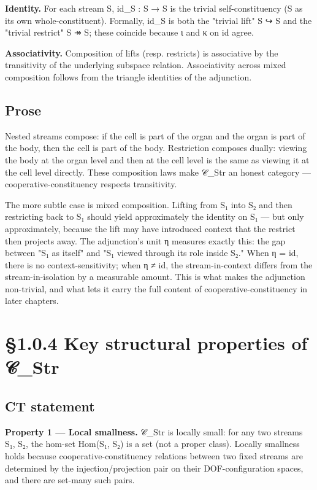 \documentclass[11pt, openany]{book}
\newcommand{\sectionbreak}{\clearpage}
\begin{document}
\textbf{Identity.} For each stream S, id\_\allowbreak{}S : S → S is the trivial self-constituency (S as its own whole-constituent). Formally, id\_\allowbreak{}S is both the "trivial lift" S ↪ S and the "trivial restrict" S ↠ S; these coincide because ι and κ on id agree.

\textbf{Associativity.} Composition of lifts (resp. restricts) is associative by the transitivity of the underlying subspace relation. Associativity across mixed composition follows from the triangle identities of the adjunction.

\subsection{Prose}

Nested streams compose: if the cell is part of the organ and the organ is part of the body, then the cell is part of the body. Restriction composes dually: viewing the body at the organ level and then at the cell level is the same as viewing it at the cell level directly. These composition laws make 𝒞\_\allowbreak{}Str an honest category --- cooperative-constituency respects transitivity.

The more subtle case is mixed composition. Lifting from S₁ into S₂ and then restricting back to S₁ should yield approximately the identity on S₁ --- but only approximately, because the lift may have introduced context that the restrict then projects away. The adjunction's unit η measures exactly this: the gap between "S₁ as itself" and "S₁ viewed through its role inside S₂." When η = id, there is no context-sensitivity; when η ≠ id, the stream-in-context differs from the stream-in-isolation by a measurable amount. This is what makes the adjunction non-trivial, and what lets it carry the full content of cooperative-constituency in later chapters.

\sectionbreak

\section{§1.0.4 Key structural properties of 𝒞\_\allowbreak{}Str}

\subsection{CT statement}

\textbf{Property 1 --- Local smallness.} 𝒞\_\allowbreak{}Str is locally small: for any two streams S₁, S₂, the hom-set Hom(S₁, S₂) is a set (not a proper class). Locally smallness holds because cooperative-constituency relations between two fixed streams are determined by the injection/projection pair on their DOF-configuration spaces, and there are set-many such pairs.
\end{document}
